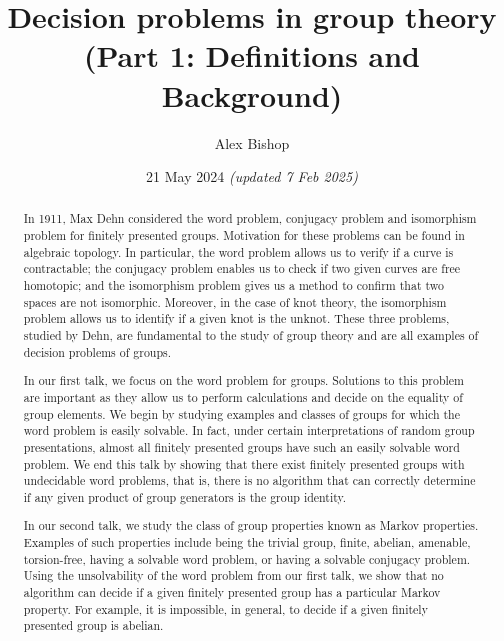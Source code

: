 \documentclass[11pt,a4paper,reqno]{amsart}
\theoremstyle{plain}
\theoremstyle{definition}
\theoremstyle{definition}
\begin{document}
\title{Decision problems in group theory\\(Part 1: Definitions and Background)}
\author{Alex Bishop}
\date{21 May 2024 \textit{(updated 7 Feb 2025)}}
\address{%
	Section de mathématiques\\
	Université de Genève\\
	rue du Conseil-Général~7-9\\
	1205 Genève, Switzerland}

\begin{abstract}
	In 1911, Max Dehn considered the word problem, conjugacy problem and isomorphism problem for finitely presented groups. Motivation for these problems can be found in algebraic topology. In particular, the word problem allows us to verify if a curve is contractable; the conjugacy problem enables us to check if two given curves are free homotopic; and the isomorphism problem gives us a method to confirm that two spaces are not isomorphic. Moreover, in the case of knot theory, the isomorphism problem allows us to identify if a given knot is the unknot. These three problems, studied by Dehn, are fundamental to the study of group theory and are all examples of decision problems of groups.

	In our first talk, we focus on the word problem for groups. Solutions to this problem are important as they allow us to perform calculations and decide on the equality of group elements. We begin by studying examples and classes of groups for which the word problem is easily solvable. In fact, under certain interpretations of random group presentations, almost all finitely presented groups have such an easily solvable word problem. We end this talk by showing that there exist finitely presented groups with undecidable word problems, that is, there is no algorithm that can correctly determine if any given product of group generators is the group identity.

	In our second talk, we study the class of group properties known as Markov properties. Examples of such properties include being the trivial group, finite, abelian, amenable, torsion-free, having a solvable word problem, or having a solvable conjugacy problem. Using the unsolvability of the word problem from our first talk, we show that no algorithm can decide if a given finitely presented group has a particular Markov property. For example, it is impossible, in general, to decide if a given finitely presented group is abelian.
\end{abstract}
\maketitle
\end{document}
